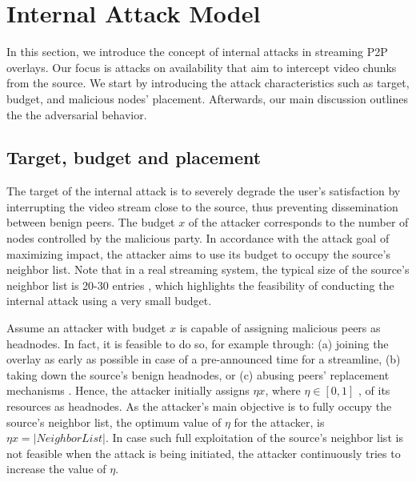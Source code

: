 \section{Internal Attack Model}
\label{sec:Attack}

In this section, we introduce the concept of internal attacks in streaming P2P overlays.
Our focus is attacks on availability that aim to intercept video chunks from the source. 
We start by introducing the attack characteristics such as target, budget, and malicious nodes' placement. 
Afterwards, our main discussion outlines the the \drop adversarial behavior. 

\subsection{Target, budget and placement}


The target of the internal attack is to severely degrade the user's satisfaction by interrupting the video stream close to the source, thus preventing dissemination between benign peers.
The budget $x$ of the attacker corresponds to the number of nodes controlled by the malicious party. 
In accordance with the attack goal of maximizing impact, the attacker aims to use its budget to occupy the source's neighbor list. 
Note that in a real streaming system, the typical size of the source's neighbor list is 20-30 entries \cite{neighborlist1,neighborlist2}, which highlights the feasibility of conducting the internal attack using a very small budget.

Assume an attacker with budget $x$ is capable of assigning malicious peers as headnodes.
In fact, it is feasible to do so, for example through: (a) joining the overlay as early as possible in case of a pre-announced time for a streamline, (b) taking down the source's benign headnodes, or (c) abusing peers' replacement mechanisms \cite{nguyen2016swap}.
Hence, the attacker initially assigns $\eta x$, where $\eta\in [0,1]$ , of its resources as headnodes.
As the attacker's main objective is to fully occupy the source's neighbor list, the optimum value of $\eta$ for the attacker, is $\eta x = |NeighborList|$.
In case such full exploitation of the source's neighbor list is not feasible when the attack is being initiated, the attacker continuously tries to increase the value of $\eta$.  

